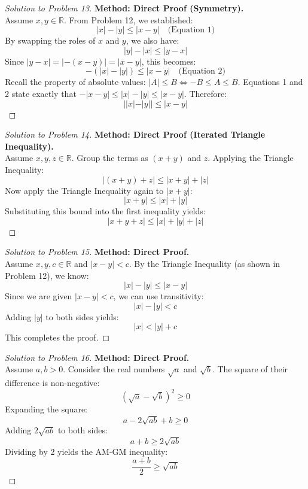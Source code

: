 \documentclass[11pt]{article}
\begin{document}
\begin{proof}[Solution to Problem 13]
    \textbf{Method: Direct Proof (Symmetry).} \\
    Assume $x, y \in \mathbb{R}$. From Problem 12, we established:
    \[ |x| - |y| \le |x - y| \quad \text{(Equation 1)} \]
    By swapping the roles of $x$ and $y$, we also have:
    \[ |y| - |x| \le |y - x| \]
    Since $|y - x| = |-(x - y)| = |x - y|$, this becomes:
    \[ -(|x| - |y|) \le |x - y| \quad \text{(Equation 2)} \]
    Recall the property of absolute values: $|A| \le B \iff -B \le A \le B$. Equations 1 and 2 state exactly that $-|x - y| \le |x| - |y| \le |x - y|$. Therefore:
    \[ ||x| - |y|| \le |x - y| \]
\end{proof}

\begin{proof}[Solution to Problem 14]
    \textbf{Method: Direct Proof (Iterated Triangle Inequality).} \\
    Assume $x, y, z \in \mathbb{R}$. Group the terms as $(x + y)$ and $z$. Applying the Triangle Inequality:
    \[ |(x + y) + z| \le |x + y| + |z| \]
    Now apply the Triangle Inequality again to $|x + y|$:
    \[ |x + y| \le |x| + |y| \]
    Substituting this bound into the first inequality yields:
    \[ |x + y + z| \le |x| + |y| + |z| \]
\end{proof}

\begin{proof}[Solution to Problem 15]
    \textbf{Method: Direct Proof.} \\
    Assume $x, y, c \in \mathbb{R}$ and $|x - y| < c$. By the Triangle Inequality (as shown in Problem 12), we know:
    \[ |x| - |y| \le |x - y| \]
    Since we are given $|x - y| < c$, we can use transitivity:
    \[ |x| - |y| < c \]
    Adding $|y|$ to both sides yields:
    \[ |x| < |y| + c \]
    This completes the proof.
\end{proof}

\begin{proof}[Solution to Problem 16]
    \textbf{Method: Direct Proof.} \\
    Assume $a, b > 0$. Consider the real numbers $\sqrt{a}$ and $\sqrt{b}$. The square of their difference is non-negative:
    \[ (\sqrt{a} - \sqrt{b})^2 \ge 0 \]
    Expanding the square:
    \[ a - 2\sqrt{ab} + b \ge 0 \]
    Adding $2\sqrt{ab}$ to both sides:
    \[ a + b \ge 2\sqrt{ab} \]
    Dividing by 2 yields the AM-GM inequality:
    \[ \frac{a + b}{2} \ge \sqrt{ab} \]
\end{proof}
\end{document}
